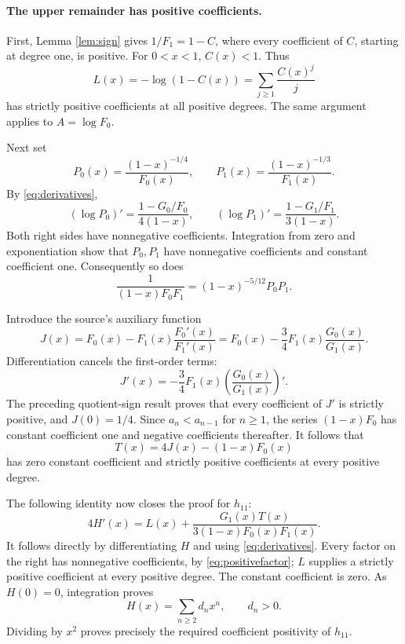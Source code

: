 \documentclass[11pt]{article}
\begin{document}
\paragraph{The upper remainder has positive coefficients.}
First, Lemma \ref{lem:sign} gives \(1/F_1=1-C\), where every
coefficient of \(C\), starting at degree one, is positive.
For \(0<x<1\), \(C(x)<1\). Thus
\[
 L(x)=-\log(1-C(x))=\sum_{j\geq1}\frac{C(x)^j}{j}
\]
has strictly positive coefficients at all positive degrees.
The same argument applies to \(A=\log F_0\).

Next set
\[
 P_0(x)=\frac{(1-x)^{-1/4}}{F_0(x)},\qquad
 P_1(x)=\frac{(1-x)^{-1/3}}{F_1(x)}.
\]
By \eqref{eq:derivatives},
\[
 (\log P_0)'=\frac{1-G_0/F_0}{4(1-x)},\qquad
 (\log P_1)'=\frac{1-G_1/F_1}{3(1-x)}.
\]
Both right sides have nonnegative coefficients. Integration from
zero and exponentiation show that \(P_0,P_1\) have nonnegative
coefficients and constant coefficient one. Consequently so does
\begin{equation}\label{eq:positivefactor}
 \frac1{(1-x)F_0F_1}=(1-x)^{-5/12}P_0P_1.
\end{equation}

Introduce the source's auxiliary function
\[
 J(x)=F_0(x)-F_1(x)\frac{F_0'(x)}{F_1'(x)}
     =F_0(x)-\frac34F_1(x)\frac{G_0(x)}{G_1(x)}.
\]
Differentiation cancels the first-order terms:
\[
 J'(x)=-\frac34F_1(x)\left(\frac{G_0(x)}{G_1(x)}\right)'.
\]
The preceding quotient-sign result proves that every coefficient
of \(J'\) is strictly positive, and \(J(0)=1/4\).
Since \(a_n<a_{n-1}\) for \(n\geq1\), the series \((1-x)F_0\)
has constant coefficient one and negative coefficients thereafter.
It follows that
\[
 T(x)=4J(x)-(1-x)F_0(x)
\]
has zero constant coefficient and strictly positive coefficients
at every positive degree.

The following identity now closes the proof for \(h_{11}\):
\begin{equation}\label{eq:key}
 4H'(x)=L(x)+\frac{G_1(x)T(x)}{3(1-x)F_0(x)F_1(x)}.
\end{equation}
It follows directly by differentiating \(H\) and using
\eqref{eq:derivatives}. Every factor on the right has nonnegative
coefficients, by \eqref{eq:positivefactor}; \(L\) supplies a strictly
positive coefficient at every positive degree.
The constant coefficient is zero. As \(H(0)=0\), integration proves
\[
 H(x)=\sum_{n\geq2}d_nx^n,\qquad d_n>0.
\]
Dividing by \(x^2\) proves precisely the required coefficient
positivity of \(h_{11}\).
\end{document}
